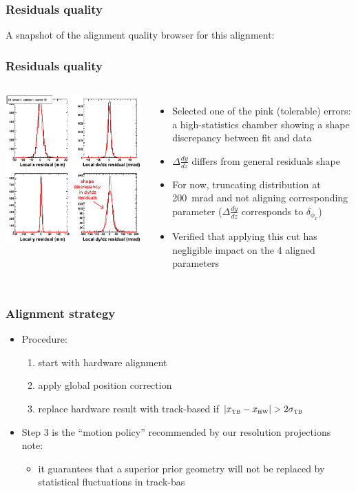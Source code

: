 \documentclass[compress]{beamer}
\begin{document}
\begin{frame}
\frametitle{Residuals quality}

A snapshot of the alignment quality browser for this alignment:

    
\end{frame}

\begin{frame}
\frametitle{Residuals quality}

\begin{columns}
\includegraphics[width=\linewidth]{dt_table_4.png}

\begin{itemize}
\item Selected one of the pink (tolerable) errors: a high-statistics
  chamber showing a shape discrepancy between fit and data

\item $\Delta \frac{dy}{dz}$ differs from general residuals shape

\item For now, truncating distribution at 200~mrad and not aligning
  corresponding parameter ($\Delta \frac{dy}{dz}$ corresponds to
  $\delta_{\phi_x}$)

\item Verified that applying this cut has negligible impact on the 4
  aligned parameters
\end{itemize}
\end{columns}
\end{frame}

\begin{frame}
\frametitle{Alignment strategy}

\begin{itemize}\setlength{\itemsep}{0.5 cm}
\item Procedure:
\begin{enumerate}\setlength{\itemsep}{0.1 cm}
\item start with hardware alignment
\item apply global position correction
\item replace hardware result with track-based if $|x_{\mbox{\tiny TB}} - x_{\mbox{\tiny HW}}| > 2 \sigma_{\mbox{\tiny TB}}$
\end{enumerate}

\item Step 3 is the ``motion policy'' recommended by our resolution projections note:
\begin{itemize}\setlength{\itemsep}{0.1 cm}
\item it guarantees that a superior prior geometry will not be
  replaced by statistical fluctuations in track-bas
\end{itemize}
\end{itemize}
\end{frame}
\end{document}
